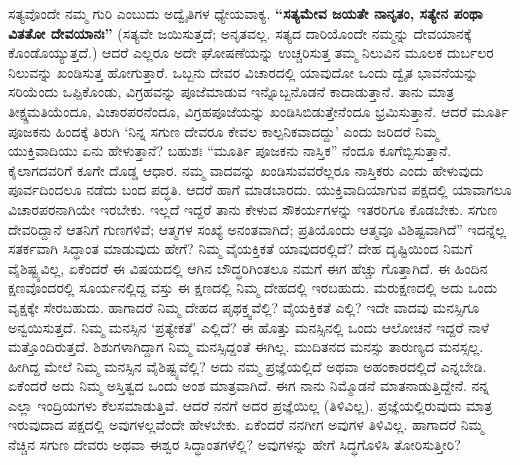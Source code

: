 ಸತ್ಯವೊಂದೇ ನಮ್ಮ ಗುರಿ ಎಂಬುದು ಅದ್ವೈತಿಗಳ ಧ್ಯೇಯವಾಕ್ಯ. \textbf{“ಸತ್ಯಮೇವ ಜಯತೇ ನಾನೃತಂ, ಸತ್ಯೇನ ಪಂಥಾ ವಿತತೋ ದೇವಯಾನಃ”} (ಸತ್ಯವೇ ಜಯಿಸುತ್ತದೆ; ಅನೃತವಲ್ಲ. ಸತ್ಯದ ದಾರಿಯೊಂದೇ ನಮ್ಮನ್ನು ದೇವಯಾನಕ್ಕೆ ಕೊಂಡೊಯ್ಯುತ್ತದೆ.) ಆದರೆ ಎಲ್ಲರೂ ಅದೇ ಘೋಷಣೆಯನ್ನು ಉಚ್ಚರಿಸುತ್ತ ತಮ್ಮ ನಿಲುವಿನ ಮೂಲಕ ದುರ್ಬಲರ ನಿಲುವನ್ನು ಖಂಡಿಸುತ್ತ ಹೋಗುತ್ತಾರೆ. ಒಬ್ಬನು ದೇವರ ವಿಚಾರದಲ್ಲಿ ಯಾವುದೋ ಒಂದು ದ್ವೈತ ಭಾವನೆಯನ್ನು ಸರಿಯೆಂದು ಒಪ್ಪಿಕೊಂಡು, ವಿಗ್ರಹವನ್ನು ಪೂಜೆಮಾಡುವ ಇನ್ನೊಬ್ಬನೊಡನೆ ಕಾದಾಡುತ್ತಾನೆ. ತಾನು ಮಾತ್ರ ತೀಕ್ಷ್ಣಮತಿಯೆಂದೂ, ವಿಚಾರಪರನೆಂದೂ, ವಿಗ್ರಹಪೂಜೆಯನ್ನು ಖಂಡಿಸಿಬಿಡುತ್ತೇನೆಂದೂ ಭ್ರಮಿಸುತ್ತಾನೆ. ಆದರೆ ಮೂರ್ತಿ ಪೂಜಕನು ಹಿಂದಕ್ಕೆ ತಿರುಗಿ ‘ನಿನ್ನ ಸಗುಣ ದೇವರೂ ಕೇವಲ ಕಾಲ್ಪನಿಕವಾದದ್ದು’ ಎಂದು ಜರಿದರೆ ನಿಮ್ಮ ಯುಕ್ತಿವಾದಿಯು ಏನು ಹೇಳುತ್ತಾನೆ? ಬಹುಶಃ “ಮೂರ್ತಿ ಪೂಜಕನು ನಾಸ್ತಿಕ” ನೆಂದೂ ಕೂಗೆಬ್ಬಿಸುತ್ತಾನೆ. ಕೈಲಾಗದವರಿಗೆ ಕೂಗೇ ದೊಡ್ಡ ಆಧಾರ. ನಮ್ಮ ವಾದವನ್ನು ಖಂಡಿಸುವವರೆಲ್ಲರೂ ನಾಸ್ತಿಕರು ಎಂದು ಹೇಳುವುದು ಪೂರ್ವದಿಂದಲೂ ನಡೆದು ಬಂದ ಪದ್ಧತಿ. ಆದರೆ ಹಾಗೆ ಮಾಡಬಾರದು. ಯುಕ್ತಿವಾದಿಯಾಗುವ ಪಕ್ಷದಲ್ಲಿ ಯಾವಾಗಲೂ ವಿಚಾರಪರನಾಗಿಯೇ ಇರಬೇಕು. ಇಲ್ಲದೆ ಇದ್ದರೆ ತಾನು ಕೇಳುವ ಸೌಕರ್ಯಗಳನ್ನು ಇತರರಿಗೂ ಕೊಡಬೇಕು. ಸಗುಣ ದೇವರಿದ್ದಾನೆ ಆತನಿಗೆ ಗುಣಗಳಿವೆ; ಆತ್ಮಗಳ ಸಂಖ್ಯೆ ಅನಂತವಾಗಿದೆ; ಪ್ರತಿಯೊಂದು ಆತ್ಮವೂ ವಿಶಿಷ್ಟವಾಗಿದೆ” ಇದನ್ನೆಲ್ಲ ಸತರ್ಕವಾಗಿ ಸಿದ್ಧಾಂತ ಮಾಡುವುದು ಹೇಗೆ? ನಿಮ್ಮ ವೈಯಕ್ತಿಕತೆ ಯಾವುದರಲ್ಲಿದೆ? ದೇಹ ದೃಷ್ಟಿಯಿಂದ ನಿಮಗೆ ವೈಶಿಷ್ಟ್ಯವಿಲ್ಲ, ಏಕೆಂದರೆ ಈ ವಿಷಯದಲ್ಲಿ ಆಗಿನ ಬೌದ್ಧರಿಗಿಂತಲೂ ನಮಗೆ ಈಗ ಹೆಚ್ಚು ಗೊತ್ತಾಗಿದೆ. ಈ ಹಿಂದಿನ ಕ್ಷಣವೊಂದರಲ್ಲಿ ಸೂರ್ಯನಲ್ಲಿದ್ದ ವಸ್ತು ಈ ಕ್ಷಣದಲ್ಲಿ ನಿಮ್ಮ ದೇಹದಲ್ಲಿ ಇರಬಹುದು. ಮರುಕ್ಷಣದಲ್ಲಿ ಅದು ಒಂದು ವೃಕ್ಷಕ್ಕೇ ಸೇರಬಹುದು. ಹಾಗಾದರೆ ನಿಮ್ಮ ದೇಹದ ಪೃಥಕ್ತ್ವವೆಲ್ಲಿ? ವೈಯಕ್ತಿಕತೆ ಎಲ್ಲಿ? ಇದೇ ವಾದವು ಮನಸ್ಸಿಗೂ ಅನ್ವಯಿಸುತ್ತದೆ. ನಿಮ್ಮ ಮನಸ್ಸಿನ ‘ಪ್ರತ್ಯೇಕತೆ’ ಎಲ್ಲಿದೆ? ಈ ಹೊತ್ತು ಮನಸ್ಸಿನಲ್ಲಿ ಒಂದು ಆಲೋಚನೆ ಇದ್ದರೆ ನಾಳೆ ಮತ್ತೊಂದಿರುತ್ತದೆ. ಶಿಶುಗಳಾಗಿದ್ದಾಗ ನಿಮ್ಮ ಮನಸ್ಸಿದ್ದಂತೆ ಈಗಿಲ್ಲ. ಮುದಿತನದ ಮನಸ್ಸು ತಾರುಣ್ಯದ ಮನಸ್ಸಲ್ಲ. ಹೀಗಿದ್ದ ಮೇಲೆ ನಿಮ್ಮ ಮನಸ್ಸಿನ ವೈಶಿಷ್ಟ್ಯವೆಲ್ಲಿ? ಅದು ನಮ್ಮ ಪ್ರಜ್ಞೆಯಲ್ಲಿದೆ ಅಥವಾ ಅಹಂಕಾರದಲ್ಲಿದೆ ಎನ್ನಬೇಡಿ. ಏಕೆಂದರೆ ಅದು ನಿಮ್ಮ ಅಸ್ತಿತ್ವದ ಒಂದು ಅಂಶ ಮಾತ್ರವಾಗಿದೆ. ಈಗ ನಾನು ನಿಮ್ಮೊಡನೆ ಮಾತನಾಡುತ್ತಿದ್ದೇನೆ. ನನ್ನ ಎಲ್ಲಾ ಇಂದ್ರಿಯಗಳು ಕೆಲಸಮಾಡುತ್ತಿವೆ. ಆದರೆ ನನಗೆ ಅದರ ಪ್ರಜ್ಞೆಯಿಲ್ಲ (ತಿಳಿವಿಲ್ಲ). ಪ್ರಜ್ಞೆಯಲ್ಲಿರುವುದು ಮಾತ್ರ ಇರುವುದಾದ ಪಕ್ಷದಲ್ಲಿ ಅವುಗಳಲ್ಲವೆಂದೇ ಹೇಳಬೇಕು. ಏಕೆಂದರೆ ನನಗೀಗ ಅವುಗಳ ತಿಳಿವಿಲ್ಲ. ಹಾಗಾದರೆ ನಿಮ್ಮ ನೆಚ್ಚಿನ ಸಗುಣ ದೇವರು ಅಥವಾ ಈಶ್ವರ ಸಿದ್ಧಾಂತಗಳೆಲ್ಲಿ? ಅವುಗಳನ್ನು ಹೇಗೆ ಸಿದ್ಧಗೊಳಿಸಿ ತೋರಿಸುತ್ತೀರಿ?

